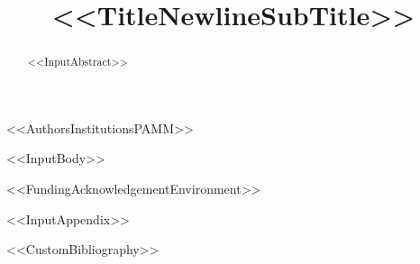 \documentclass[%
pamm,
a4paper,
fleqn,
<<DocumentClassOptions>>]{w-art}
\begin{document}
\TitleLanguage[EN]
\title[<<ShortTitle>>]{<<TitleNewlineSubTitle>>}

<<AuthorsInstitutionsPAMM>>


\AbstractLanguage[EN]
\begin{abstract}
<<InputAbstract>>
\end{abstract}

\maketitle

<<InputBody>>

<<FundingAcknowledgementEnvironment>>

\appendix
<<InputAppendix>>


<<CustomBibliography>>
\end{document}
